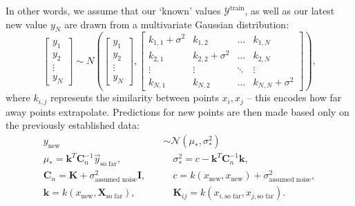 \documentclass{article}
\begin{document}
In other words, we assume that our `known' values $\mathcal{Y}^\text{train}$, as well as our latest new value $y_N$ are drawn from a multivariate Gaussian distribution:
\begin{equation}
    \left[ \begin{array}{c} {y}_1 \\ {y}_2 \\ \vdots \\ y_N \end{array} \right] \sim {N}\left( \left[ \begin{array}{c} {y}_1 \\ {y}_2 \\ \vdots \\ y_N \end{array} \right], \left[ \begin{array}{cccc} k_{1,1}+\sigma^2 & k_{1,2} & \dots & k_{1,N} \\ k_{2,1} & k_{2,2}+\sigma^2 & \dots & k_{2,N} \\ \vdots & \vdots & \ddots & \vdots \\ k_{N,1} & k_{N,2} & \dots & k_{N,N}+\sigma^2 \end{array} \right] \right)\label{eq:gppdistribution},
\end{equation}
where $k_{i,j}$ represents the similarity between points $x_i,x_j$ -- this encodes how far away points extrapolate. Predictions for new points are then made based only on the previously established data:
\begin{align}
    y_\text{new} & \sim \mathcal{N}(\mu_*, \sigma^2_*)\\
\mu_* = \mathbf{k}^T\mathbf{C}_n^{-1}\vec{y}_\text{so far},\quad&\quad\sigma^2_*=c-\mathbf{k}^T\mathbf{C}_n^{-1}\mathbf{k},\\
\mathbf{C}_n=\mathbf{K}+\sigma_\text{assumed noise}^2\mathbf{I},\quad&\quad c{=}k(x_\text{new},x_\text{new})+\sigma_\text{assumed noise}^2,\\
\mathbf{k}=k(x_\text{new},\mathbf{X}_\text{so far}),\quad&\quad\mathbf{K}_{ij}=k(x_{i,\text{so far}},x_{j,\text{so far}}).
\end{align}


\end{document}

